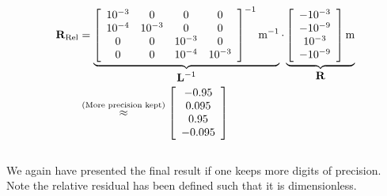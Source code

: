 \begin{equation}
\begin{split}
\mathbf{R}_{\text{Rel}}&=\mathop{\underbrace{\left[\begin{array}{cccc}10^{-3}&0&0&0\\10^{-4}&10^{-3}&0&0\\0&0&10^{-3}&0\\0&0&10^{-4}&10^{-3}\end{array}\right]^{-1}\text{m}^{-1}}_{\displaystyle{\mathbf{L}^{-1}}}}\cdot\mathop{\underbrace{\left[\begin{array}{c}-10^{-3}\\-10^{-9}\\10^{-3}\\-10^{-9}\end{array}\right]\text{m}}_{\displaystyle{\mathbf{R}}}} \\
&\stackrel{\text{(More precision kept)}}{\approx}\left[\begin{array}{c}-0.95\\0.095\\0.95\\-0.095\end{array}\right]
\end{split}
\end{equation}
{}\\
We again have presented the final result if one keeps more digits of precision.  Note the relative residual has been defined such that it is dimensionless.


